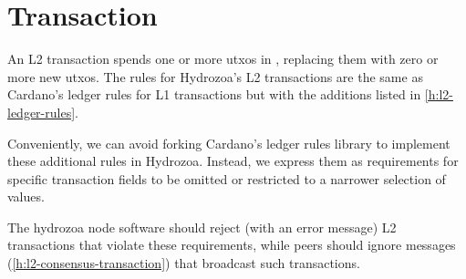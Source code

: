 \documentclass[../hydrozoa.tex]{subfiles}
\begin{document}
\section{Transaction}%
\label{h:ledger-transaction}%

An L2 transaction spends one or more utxos in , replacing them with zero or more new utxos.
The rules for Hydrozoa's L2 transactions are the same as Cardano's ledger rules for L1 transactions but with the additions listed in \cref{h:l2-ledger-rules}.

Conveniently, we can avoid forking Cardano's ledger rules library to implement these additional rules in Hydrozoa.
Instead, we express them as requirements for specific transaction fields to be omitted or restricted to a narrower selection of values.

The hydrozoa node software should reject (with an error message) L2 transactions that violate these requirements, while peers should ignore  messages (\cref{h:l2-consensus-transaction}) that broadcast such transactions.
\end{document}
